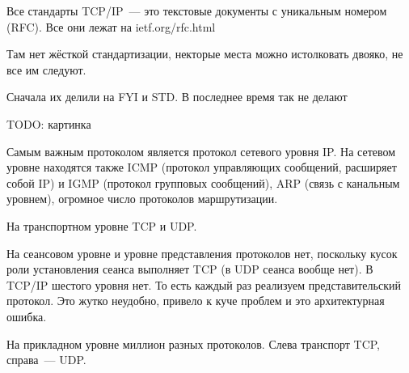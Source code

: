 
Все стандарты TCP/IP~--- это текстовые документы с уникальным номером (RFC). Все они лежат на ietf.org/rfc.html

Там нет жёсткой стандартизации, некторые места можно истолковать двояко, не все им следуют.

Сначала их делили на FYI и STD. В последнее время так не делают


TODO: картинка

Самым важным протоколом является протокол сетевого уровня IP. На сетевом уровне находятся также ICMP (протокол управляющих сообщений, расширяет собой IP) и IGMP (протокол групповых сообщений), ARP (связь с канальным уровнем), огромное число протоколов маршрутизации.

На транспортном уровне TCP и UDP. 

На сеансовом уровне и уровне представления протоколов нет, поскольку кусок роли установления сеанса выполняет TCP (в UDP сеанса вообще нет). В TCP/IP шестого уровня нет. То есть каждый раз реализуем представительский протокол. Это жутко неудобно, привело к куче проблем и это архитектурная ошибка.

На прикладном уровне миллион разных протоколов. Слева транспорт TCP, справа~--- UDP. 
